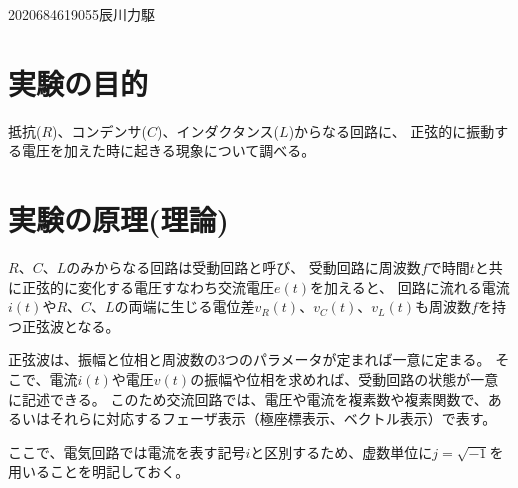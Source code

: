 \documentclass[12pt]{jarticle}
\begin{document}
{2020}{6}{8}{4619055}{辰川力駆}



\section{実験の目的}
抵抗($R$)、コンデンサ($C$)、インダクタンス($L$)からなる回路に、
正弦的に振動する電圧を加えた時に起きる現象について調べる。

\section{実験の原理(理論)}
$R$、$C$、$L$のみからなる回路は受動回路と呼び、
受動回路に周波数$f$で時間$t$と共に正弦的に変化する電圧すなわち交流電圧$e(t)$を加えると、
回路に流れる電流$i(t)$や$R$、$C$、$L$の両端に生じる電位差$v_R(t)$、$v_C(t)$、$v_L(t)$も周波数$f$を持つ正弦波となる。

正弦波は、振幅と位相と周波数の3つのパラメータが定まれば一意に定まる。
そこで、電流$i(t)$や電圧$v(t)$の振幅や位相を求めれば、受動回路の状態が一意に記述できる。
このため交流回路では、電圧や電流を複素数や複素関数で、あるいはそれらに対応するフェーザ表示（極座標表示、ベクトル表示）で表す。

ここで、電気回路では電流を表す記号$i$と区別するため、虚数単位に$j = \sqrt{-1}$を用いることを明記しておく。
\end{document}
